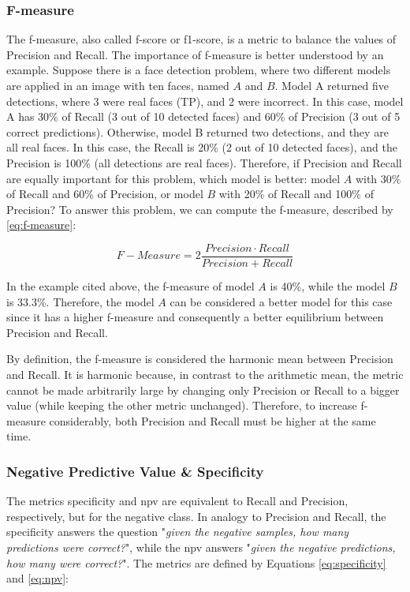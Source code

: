 \subsubsection{F-measure}

The f-measure, also called f-score or f1-score, is a metric to balance the values of Precision and Recall. The importance of f-measure is better understood by an example. Suppose there is a face detection problem, where two different models are applied in an image with ten faces, named $A$ and $B$. Model A returned five detections, where 3 were real faces (TP), and 2 were incorrect. In this case, model A has 30\% of Recall (3 out of 10 detected faces) and 60\% of Precision (3 out of 5 correct predictions). Otherwise, model B returned two detections, and they are all real faces. In this case, the Recall is 20\% (2 out of 10 detected faces), and the Precision is 100\% (all detections are real faces). Therefore, if Precision and Recall are equally important for this problem, which model is better: model $A$ with 30\% of Recall and 60\% of Precision, or model $B$ with 20\% of Recall and 100\% of Precision? To answer this problem, we can compute the f-measure, described by \autoref{eq:f-measure}: 

\begin{equation}
\label{eq:f-measure}
F{-}Measure = 2\frac{Precision \cdot Recall}{Precision + Recall}
\end{equation}

In the example cited above, the f-measure of model $A$ is 40\%, while the model $B$ is 33.3\%. Therefore, the model $A$ can be considered a better model for this case since it has a higher f-measure and consequently a better equilibrium between Precision and Recall.

By definition, the f-measure is considered the harmonic mean between Precision and Recall. It is harmonic because, in contrast to the arithmetic mean, the metric cannot be made arbitrarily large by changing only Precision or Recall to a bigger value (while keeping the other metric unchanged). Therefore, to increase f-measure considerably, both Precision and Recall must be higher at the same time.

\subsubsection{Negative Predictive Value \& Specificity}

The metrics specificity and \acf{npv} are equivalent to Recall and Precision, respectively, but for the negative class. In analogy to Precision and Recall, the specificity answers the question "\textit{given the negative samples, how many predictions were correct?}", while the \acs{npv} answers "\textit{given the negative predictions, how many were correct?}". The metrics are defined by Equations \ref{eq:specificity} and \ref{eq:npv}:


